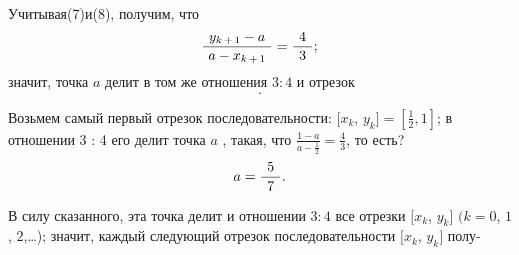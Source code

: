 \begin{minipage}[t]{0.5\linewidth}
Учитывая\hspace{2mm}(7)\hspace{2mm}и\hspace{2mm}(8), получим, что
\begin{equation}
    \frac{\hspace{1.5mm}y_{k\hspace{0.5mm}+\hspace{0.5mm}1} - a\hspace{1.5mm}}{a - x_{k\hspace{0.5mm}+\hspace{0.5mm}1}} = \frac{\hspace{1.5mm}4\hspace{1.5mm}}{3};
\end{equation}
значит, точка $a$ делит в том же отношения $3:4$ и отрезок
\begin{equation*}
    [x_{k + 1}, \hspace{1mm}y_{k+1}].
\end{equation*}

Возьмем самый первый отрезок последовательности: $[x_k$, \hspace{1mm}$y_k] = [\frac{1}{2},1]$; в отношении 3 : 4 
его делит точка $a$ , такая, что $\frac{1 - a}{a - \frac{1}{2}} = \frac{4}{3}$, то есть?
\begin{equation}
    a = \frac{\hspace{1.5mm}5\hspace{1.5mm}}{7}.
\end{equation}

В силу сказанного, эта точка делит и отношении $3:4$ все отрезки $[x_k$, \hspace{1mm}$y_k]$ \hspace{1mm}$(k = 0$, \hspace{1mm}$1$, \hspace{1mm}$2$,\hspace{1mm}\ldots); значит, каждый следующий отрезок последовательности $[x_k$, \hspace{1mm}$y_k]$ полу-
\end{minipage}


